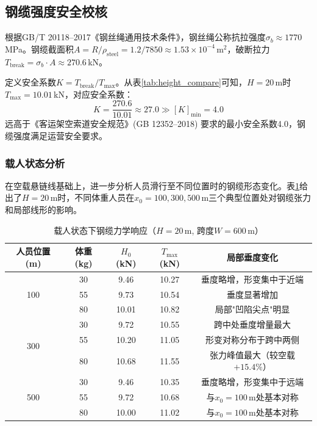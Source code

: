 \documentclass[12pt,a4paper]{ctexart}
\begin{document}
\subsection{钢缆强度安全校核}

根据GB/T 20118--2017《钢丝绳通用技术条件》，钢丝绳公称抗拉强度$\sigma_b \approx 1770$\,MPa。钢缆截面积$A = R/\rho_{\text{steel}} = 1.2/7850 \approx 1.53 \times 10^{-4}$\,m$^2$，破断拉力$T_{\text{break}} = \sigma_b \cdot A \approx 270.6$\,kN。

定义安全系数$K = T_{\text{break}} / T_{\max}$。从表\ref{tab:height_compare}可知，$H = 20$\,m时$T_{\max} = 10.01$\,kN，对应安全系数：
\begin{equation}
  K = \frac{270.6}{10.01} \approx 27.0 \gg [K]_{\min} = 4.0
\end{equation}
远高于《客运架空索道安全规范》(GB 12352--2018) 要求的最小安全系数4.0，钢缆强度满足运营安全要求。

\subsubsection{载人状态分析}

在空载悬链线基础上，进一步分析人员滑行至不同位置时的钢缆形态变化。表\ref{tab:loaded_state}给出了$H=20$\,m时，不同体重人员在$x_0=100,300,500$\,m三个典型位置处对钢缆张力和局部线形的影响。

\begin{table}[H]
  \centering
  \caption{载人状态下钢缆力学响应（$H=20$\,m, 跨度$W=600$\,m）}
  \label{tab:loaded_state}
  \renewcommand{\arraystretch}{1.2}
  \begin{tabular}{c|c|c|c|c}
    \toprule
    \textbf{人员位置 (m)} & \textbf{体重 (kg)} & $H_0$ (kN) & $T_{\max}$ (kN) & 局部垂度变化 \\
    \midrule
    \multirow{3}{*}{100}
      & 30  & 9.46 & 10.27 & 垂度略增，形变集中于近端 \\
      & 55  & 9.73 & 10.54 & 垂度显著增加 \\
      & 80  & 10.01 & 10.82 & 局部"凹陷尖点"明显 \\
    \midrule
    \multirow{3}{*}{300}
      & 30  & 9.72 & 10.55 & 跨中处垂度增量最大 \\
      & 55  & 10.20 & 11.05 & 形变对称分布于跨中两侧 \\
      & 80  & 10.68 & 11.55 & 张力峰值最大（较空载$+15.4\%$） \\
    \midrule
    \multirow{3}{*}{500}
      & 30  & 9.46 & 10.35 & 垂度略增，形变集中于远端 \\
      & 55  & 9.72 & 10.68 & 与$x_0=100$\,m处基本对称 \\
      & 80  & 10.00 & 11.02 & 与$x_0=100$\,m处基本对称 \\
    \bottomrule
  \end{tabular}
\end{table}
\end{document}

